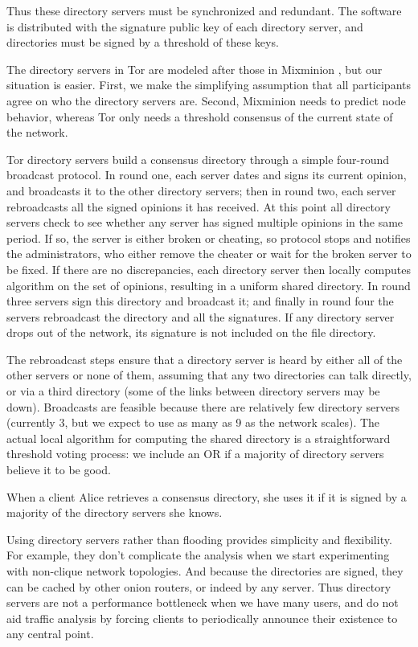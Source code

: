 \documentclass[times,10pt,twocolumn]{article}
\begin{document}
Thus these directory servers must be synchronized and redundant. The
software is distributed with the signature public key of each directory
server, and directories must be signed by a threshold of these keys.

The directory servers in Tor are modeled after those in Mixminion
\cite{minion-design}, but our situation is easier. First, we make the
simplifying assumption that all participants agree on who the
directory servers are. Second, Mixminion needs to predict node
behavior, whereas Tor only needs a threshold consensus of the current
state of the network.

Tor directory servers build a consensus directory through a simple
four-round broadcast protocol.  In round one, each server dates and
signs its current opinion, and broadcasts it to the other directory
servers; then in round two, each server rebroadcasts all the signed
opinions it has received.  At this point all directory servers check
to see whether any server has signed multiple opinions in the same
period. If so, the server is either broken or cheating, so protocol
stops and notifies the administrators, who either remove the cheater
or wait for the broken server to be fixed.  If there are no
discrepancies, each directory server then locally computes algorithm
on the set of opinions, resulting in a uniform shared directory. In
round three servers sign this directory and broadcast it; and finally
in round four the servers rebroadcast the directory and all the
signatures.  If any directory server drops out of the network, its
signature is not included on the file directory.

The rebroadcast steps ensure that a directory server is heard by
either all of the other servers or none of them, assuming that any two
directories can talk directly, or via a third directory (some of the
links between directory servers may be down). Broadcasts are feasible
because there are relatively few directory servers (currently 3, but we expect
to use as many as 9 as the network scales). The actual local algorithm
for computing the shared directory is a straightforward threshold
voting process: we include an OR if a majority of directory servers
believe it to be good.

When a client Alice retrieves a consensus directory, she uses it if it
is signed by a majority of the directory servers she knows.

Using directory servers rather than flooding provides simplicity and
flexibility. For example, they don't complicate the analysis when we
start experimenting with non-clique network topologies. And because
the directories are signed, they can be cached by other onion routers,
or indeed by any server.  Thus directory servers are not a performance
bottleneck when we have many users, and do not aid traffic analysis by
forcing clients to periodically announce their existence to any
central point.
\end{document}
